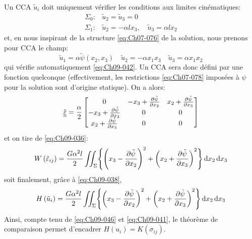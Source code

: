 Un CCA $\tilde{u}_i$ doit uniquement vérifier les conditions aux limites cinématiques: 
\begin{equation}
    \begin{aligned}
        \Sigma_0: & \tilde{u}_2 = \tilde{u}_3 = 0 \\
        \Sigma_1: & \tilde{u}_2 = -\alpha l x_3, \quad \tilde{u}_3 = \alpha l x_2
    \end{aligned}
    \label{eq:Ch09-042}
\end{equation}
et, en nous inspirant de la structure \eqref{eq:Ch07-076} de la solution, nous prenons pour CCA le champ: 
\begin{equation}
    \tilde{u}_1 = \alpha \tilde{\psi} (x_2, x_3) \quad \tilde{u}_2 = -\alpha x_1 x_3 \quad \tilde{u}_3 = \alpha x_1 x_2
    \label{eq:Ch09-043}
\end{equation}
qui vérifie automatiquement \eqref{eq:Ch09-042}.
Un CCA sera donc défini par une fonction quelconque (effectivement, les restrictions \eqref{eq:Ch07-078} imposées à $\psi$ pour la solution sont d'origine statique).
On a alors:
\begin{equation}
    \tilde{\underline{\underline{\varepsilon}}} = \frac{\alpha}{2}
    \begin{bmatrix}
        0 & -x_3 + \frac{\partial \tilde{\psi}}{\partial x_2} & x_2 + \frac{\partial \tilde{\psi}}{\partial x_3} \\
        -x_3 + \frac{\partial \tilde{\psi}}{\partial x_2} & 0 & 0 \\
        x_2 + \frac{\partial \tilde{\psi}}{\partial x_3} & 0 & 0
    \end{bmatrix}
    \label{eq:Ch09-044}
\end{equation}
et on tire de \eqref{eq:Ch09-036}: 
\begin{equation}
    W \left( \tilde{\varepsilon}_{ij} \right) = \frac{G\alpha^2 l}{2} \iint_{\Sigma} \Biggl\{ \Biggl( x_3 - \frac{\partial \tilde{\psi}}{\partial x_2} \Biggr)^2 + \left( x_2 + \frac{\partial \tilde{\psi}}{\partial x_3} \right)^2 \Biggr\}\mathop{\mathrm{{}d}}\mathopen{} x_2 \mathop{\mathrm{{}d}}\mathopen{} x_3
    \label{eq:Ch09-045}
\end{equation}
soit finalement, grâce à \eqref{eq:Ch09-038}, 
\begin{equation}
    H \left( \tilde{u}_{i} \right) = \frac{G\alpha^2 l}{2} \iint_{\Sigma}\Biggl\{ \left( x_3 - \frac{\partial \tilde{\psi}}{\partial x_2} \right)^2 + \left( x_2 + \frac{\partial \tilde{\psi}}{\partial x_3} \right)^2 \Biggr\}\mathop{\mathrm{{}d}}\mathopen{} x_2 \mathop{\mathrm{{}d}}\mathopen{} x_3
    \label{eq:Ch09-046}
\end{equation}
Ainsi, compte tenu de \eqref{eq:Ch09-046} et \eqref{eq:Ch09-041}, le théorème de comparaison permet d'encadrer $H(u_i) = K(\sigma_{ij})$.
